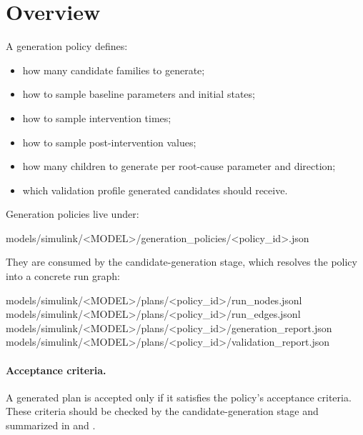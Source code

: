 \documentclass[11pt]{article}
\begin{document}
\label{docstart:generation_policy_schema}

\section*{Overview}
A generation policy defines:

\begin{itemize}
    \item how many candidate families to generate;
    \item how to sample baseline parameters and initial states;
    \item how to sample intervention times;
    \item how to sample post-intervention values;
    \item how many children to generate per root-cause parameter and direction;
    \item which validation profile generated candidates should receive.
\end{itemize}

Generation policies live under:

\begin{DocCode}
models/simulink/<MODEL>/generation_policies/<policy_id>.json
\end{DocCode}

They are consumed by the candidate-generation stage, which resolves the policy into a concrete run graph:

\begin{DocCode}
models/simulink/<MODEL>/plans/<policy_id>/run_nodes.jsonl
models/simulink/<MODEL>/plans/<policy_id>/run_edges.jsonl
models/simulink/<MODEL>/plans/<policy_id>/generation_report.json
models/simulink/<MODEL>/plans/<policy_id>/validation_report.json
\end{DocCode}



\paragraph{Acceptance criteria.}
A generated plan is accepted only if it satisfies the policy's acceptance criteria.
These criteria should be checked by the candidate-generation stage and summarized in  and .
\end{document}
